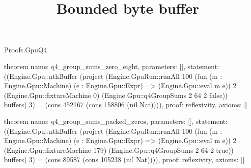 \begin{lexlean}{Proofs.GpuQ4}
\title{Bounded byte buffer}
\begin{semanticmodule}
theorem{
  name: q4_group_sums_zero_eight,
  parameters: [],
  statement: ((Engine.Gpu::nthBuffer (project (Engine.GpuRun::runAll 100 (fun (m : Engine.Gpu::Machine) (e : Engine.Gpu::Expr) => (Engine.Gpu::eval m e)) 2 (Engine.Gpu::fixtureMachine 0) (Engine.Gpu::q4GroupSums 2 64 2 false)) buffers) 3) = (cons 452167 (cons 158806 (nil Nat)))),
  proof: reflexivity{},
  axioms: []
}

theorem{
  name: q4_group_sums_packed_zeros,
  parameters: [],
  statement: ((Engine.Gpu::nthBuffer (project (Engine.GpuRun::runAll 100 (fun (m : Engine.Gpu::Machine) (e : Engine.Gpu::Expr) => (Engine.Gpu::eval m e)) 2 (Engine.Gpu::fixtureMachine 179) (Engine.Gpu::q4GroupSums 2 64 2 true)) buffers) 3) = (cons 89587 (cons 105238 (nil Nat)))),
  proof: reflexivity{},
  axioms: []
}
\end{semanticmodule}
\end{lexlean}

